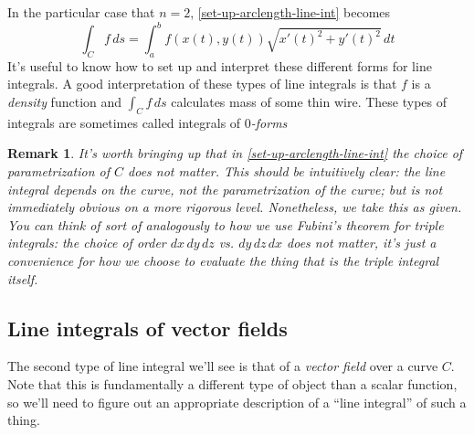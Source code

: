 \documentclass[12pt]{article}
\numberwithin{equation}{subsection}
\numberwithin{figure}{subsection}
\theoremstyle{note}
\newtheorem{remark}[subsection]{Remark}
\begin{document}
{In the particular case that $n=2$, \eqref{set-up-arclength-line-int} becomes
\begin{equation} \int_C f \,ds = \int_a^b f\left( x(t),y(t) \right) \sqrt{ x'(t)^2 +y'(t)^2 } \,dt\end{equation}
It's useful to know how to set up and interpret these different forms for line integrals. A good interpretation of these types of line integrals is that $f$ is a \textit{density} function and $\int_C f\,ds$ calculates mass of some thin wire. These types of integrals are sometimes called integrals of \textit{$0$-forms}

\begin{remark}It's worth bringing up that in \eqref{set-up-arclength-line-int} the \textit{choice} of parametrization of $C$ does not matter. This should be intuitively clear: the line integral depends on the curve, not the \textit{parametrization} of the curve; but is not immediately obvious on a more rigorous level. Nonetheless, we take this as given. You can think of sort of analogously to how we use Fubini's theorem for triple integrals: the choice of order $dx\,dy\,dz$ vs. $dy\,dz\,dx$ does not matter, it's just a convenience for how we choose to evaluate the thing that is the triple integral itself. \end{remark}




\subsection{Line integrals of vector fields} The second type of line integral we'll see is that of a \textit{vector field} over a curve $C$. Note that this is fundamentally a different type of object than a scalar function, so we'll need to figure out an appropriate description of a ``line integral'' of such a thing. 

}
\end{document}
